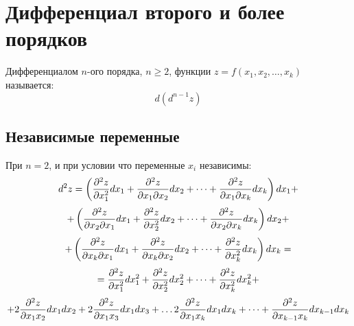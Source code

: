 \section{Дифференциал второго и более порядков}
Дифференциалом $n$-ого порядка, $n \geq 2$, функции $z=f(x_1, x_2, \dots, x_k)$ называется:
$$d(d^{n-1}z)$$
\subsection{Независимые переменные}
При $n = 2$, и при условии что переменные $x_i$ независимы:
$$d^2z = \left(
{\partial^2z \over \partial x_1^2}d x_1 +
{\partial^2z \over \partial x_1\partial x_2}d x_2 +
\dots +
{\partial^2z \over \partial x_1\partial x_k}d x_k  
\right)d x_1 + $$
$$ + \left(
{\partial^2z \over \partial x_2\partial x_1}d x_1 +
{\partial^2z \over \partial x_2^2}d x_2 +
\dots +
{\partial^2z \over \partial x_2\partial x_k}d x_k  
\right)d x_2 + $$
$$ + \left({\partial^2z \over \partial x_k\partial x_1}d x_1 +
{\partial^2z \over \partial x_k\partial x_2}d x_2 +
\dots +
{\partial^2z \over \partial x_k^2}d x_k  
\right)d x_k = $$
$$= {\partial^2z \over \partial x_1^2}d x_1^2 +
{\partial^2z \over \partial x_2^2}d x_2^2 +
\dots  +
{\partial^2z \over \partial x_k^2}d x_k^2 +  $$
$$+ 2 {\partial^2z \over \partial x_1x_2}dx_1dx_2 + 
2{\partial^2z \over \partial x_1x_3}dx_1dx_3 +
\dots
2{\partial^2z \over \partial x_1x_k}dx_1dx_k +
\dots  +
{\partial^2z \over \partial x_{k-1}x_k}dx_{k-1}dx_k$$


